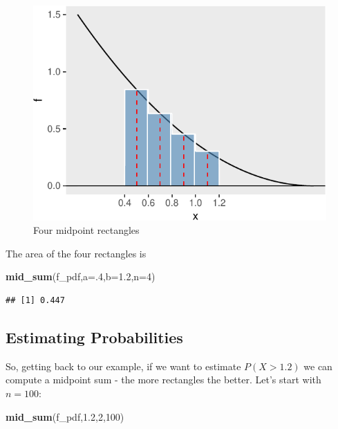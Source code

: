 \documentclass[
]{book}
\newenvironment{Shaded}{\begin{snugshade}}{\end{snugshade}}
\newcommand{\AttributeTok}[1]{\textcolor[rgb]{0.13,0.29,0.53}{#1}}
\newcommand{\DecValTok}[1]{\textcolor[rgb]{0.00,0.00,0.81}{#1}}
\newcommand{\FloatTok}[1]{\textcolor[rgb]{0.00,0.00,0.81}{#1}}
\newcommand{\FunctionTok}[1]{\textcolor[rgb]{0.13,0.29,0.53}{\textbf{#1}}}
\newcommand{\NormalTok}[1]{#1}
\theoremstyle{definition}
\theoremstyle{definition}
\theoremstyle{definition}
\theoremstyle{definition}
\theoremstyle{remark}
\begin{document}
\begin{figure}
\centering
\includegraphics{math340-notes_files/figure-latex/midpoint-sum-1.pdf}
\caption{\label{fig:midpoint-sum}Four midpoint rectangles}
\end{figure}

The area of the four rectangles is

\begin{Shaded}
\begin{Highlighting}[]
\FunctionTok{mid\_sum}\NormalTok{(f\_pdf,}\AttributeTok{a=}\NormalTok{.}\DecValTok{4}\NormalTok{,}\AttributeTok{b=}\FloatTok{1.2}\NormalTok{,}\AttributeTok{n=}\DecValTok{4}\NormalTok{)}
\end{Highlighting}
\end{Shaded}

\begin{verbatim}
## [1] 0.447
\end{verbatim}

\subsection*{Estimating Probabilities}\label{estimating-probabilities}

So, getting back to our example, if we want to estimate \(P(X > 1.2)\) we can compute a midpoint sum - the more rectangles the better. Let's start with \(n = 100\):

\begin{Shaded}
\begin{Highlighting}[]
\FunctionTok{mid\_sum}\NormalTok{(f\_pdf,}\FloatTok{1.2}\NormalTok{,}\DecValTok{2}\NormalTok{,}\DecValTok{100}\NormalTok{)}
\end{Highlighting}
\end{Shaded}
\end{document}
